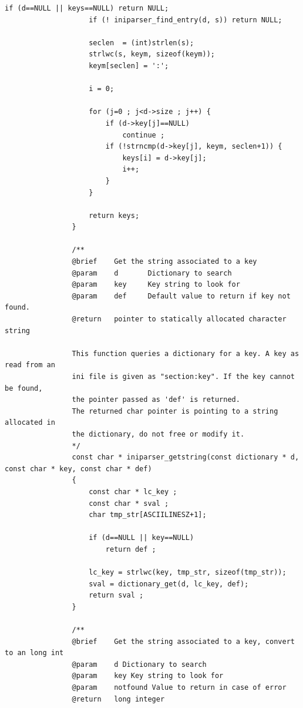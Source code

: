 \documentclass{article}
\begin{document}
\begin{Verbatim}[gobble=8]
                    if (d==NULL || keys==NULL) return NULL;
                    if (! iniparser_find_entry(d, s)) return NULL;
                
                    seclen  = (int)strlen(s);
                    strlwc(s, keym, sizeof(keym));
                    keym[seclen] = ':';
                
                    i = 0;
                
                    for (j=0 ; j<d->size ; j++) {
                        if (d->key[j]==NULL)
                            continue ;
                        if (!strncmp(d->key[j], keym, seclen+1)) {
                            keys[i] = d->key[j];
                            i++;
                        }
                    }
                
                    return keys;
                }
                
                /**
                @brief    Get the string associated to a key
                @param    d       Dictionary to search
                @param    key     Key string to look for
                @param    def     Default value to return if key not found.
                @return   pointer to statically allocated character string
                
                This function queries a dictionary for a key. A key as read from an
                ini file is given as "section:key". If the key cannot be found,
                the pointer passed as 'def' is returned.
                The returned char pointer is pointing to a string allocated in
                the dictionary, do not free or modify it.
                */
                const char * iniparser_getstring(const dictionary * d, const char * key, const char * def)
                {
                    const char * lc_key ;
                    const char * sval ;
                    char tmp_str[ASCIILINESZ+1];
                
                    if (d==NULL || key==NULL)
                        return def ;
                
                    lc_key = strlwc(key, tmp_str, sizeof(tmp_str));
                    sval = dictionary_get(d, lc_key, def);
                    return sval ;
                }
                
                /**
                @brief    Get the string associated to a key, convert to an long int
                @param    d Dictionary to search
                @param    key Key string to look for
                @param    notfound Value to return in case of error
                @return   long integer
                

\end{Verbatim}
\end{document}
